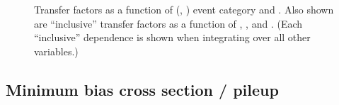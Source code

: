 \begin{figure}[!h]
{  } \\
   ~
  \caption{\label{fig:tf_mmZinv} Transfer factors as a function of
    (\njet, \nb) event category and \scalht. Also shown are
    ``inclusive'' transfer factors as a function of \njet, \scalht,
    and \nb. (Each ``inclusive'' dependence is shown when integrating
    over all other variables.) }
\end{figure}

\clearpage
\subsection{Minimum bias cross section / pileup}

